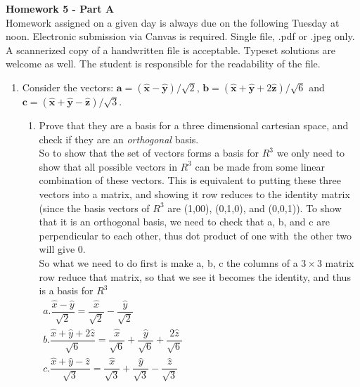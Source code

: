 \documentclass[fleqn]{article}
\begin{document}

{\bf Homework 5 - Part A}\\
Homework assigned on a given day is always due on the following Tuesday at noon. Electronic submission via Canvas is required. Single file, .pdf or .jpeg only.  A scannerized copy of a handwritten file is acceptable. Typeset solutions are welcome as well. The student is responsible for the readability of the file. 

\begin{enumerate}


\item Consider the vectors: $\mathbf{a}=( \mathbf{\hat{x}} - \mathbf{\hat{y}} ) / \sqrt{2} $, $\mathbf{b}=( \mathbf{\hat{x}} + \mathbf{\hat{y}} + 2 \mathbf{\hat{z}} ) / \sqrt{6}$ and $\mathbf{c}=(\mathbf{\hat{x}}+\mathbf{\hat{y}}-\mathbf{\hat{z}})/\sqrt{3}$. 
\begin{enumerate}
\item Prove that they are a basis for a three dimensional cartesian space, and check if they are an \emph{orthogonal} basis. 
\\

So to show that the set of vectors forms a basis for $R^3$ we only need to show that all possible vectors in $R^3$ can be made from some linear combination of these vectors. This is equivalent to putting these three vectors into a matrix, and showing it row reduces to the identity matrix (since the basis vectors of $R^3$ are (1,00), (0,1,0), and (0,0,1)). To show that it is an orthogonal basis, we need to check that a, b, and c are perpendicular to each other, thus dot product of one with the other two will give 0.
\\
So what we need to do first is make a, b, c the columns of a $3\times3$ matrix row reduce that matrix, so that we see it becomes the identity, and thus is a basis for $R^3$
\\

\noindent
$
\begin{array}{lll}
  a.\dfrac{\hat{x}-\hat{y}}{\sqrt{2}}=\dfrac{\hat{x}}{\sqrt{2}}-\dfrac{\hat{y}}{\sqrt{2}} \\
  b.\dfrac{\hat{x}+\hat{y}+2\hat{z}}{\sqrt{6}}=\dfrac{\hat{x}}{\sqrt{6}}+\dfrac{\hat{y}}{\sqrt{6}}+\dfrac{2\hat{z}}{\sqrt{6}} \\
  c.\dfrac{\hat{x}+\hat{y}-\hat{z}}{\sqrt{3}}=\dfrac{\hat{x}}{\sqrt{3}}+\dfrac{\hat{y}}{\sqrt{3}}-\dfrac{\hat{z}}{\sqrt{3}}
  \end{array}  
$
\\
\\
\\
\\


\end{enumerate}
\end{enumerate}
\end{document}
